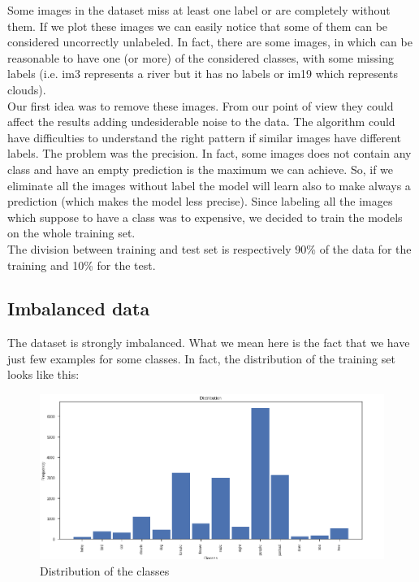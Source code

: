 Some images in the dataset miss at least one label or are completely without them. If we plot these images we can easily notice that some of them can be considered uncorrectly unlabeled. In fact, there are some images, in which can be reasonable to have one (or more) of the considered classes, with some missing labels (i.e. im3 represents a river but it has no labels or im19 which represents clouds). \\
Our first idea was to remove these images. From our point of view they could affect the results adding undesiderable noise to the data. The algorithm could have difficulties to understand the right pattern if similar images have different labels.
The problem was the precision. In fact, some images does not contain any class and have an empty prediction is the maximum we can achieve. So, if we eliminate all the images without label the model will learn also to make always a prediction (which makes the model less precise).
Since labeling all the images which suppose to have a class was to expensive, we decided to train the models on the whole training set. \\
The division between training and test set is respectively 90\% of the data for the training and 10\% for the test.

\subsection{Imbalanced data}

The dataset is strongly imbalanced. What we mean here is the fact that we have just few examples for some classes. In fact, the distribution of the training set looks like this:

\begin{figure}[!h]
	\begin{center}
		\includegraphics[width=0.6\linewidth]{images/distribution}
		\caption{Distribution of the classes}
		\label{fig:distribution-classes}
	\end{center}
\end{figure}


